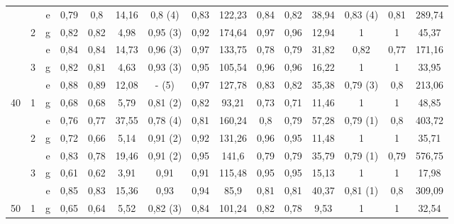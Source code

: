 \begin{table}[h!]
{\begin{tabular}{|c|c|c||ccc|ccc||ccc|ccc|}
          &       & e     & 0,79  & 0,8   & 14,16 & \textcolor[rgb]{ 1,  0,  0}{0,8 (4)} & 0,83  & 122,23 & 0,84  & 0,82  & 38,94 & \textcolor[rgb]{ 1,  0,  0}{0,83 (4)} & 0,81  & 289,74 \bigstrut[b]\\
\cline{2-15}          & \multirow{2}[2]{*}{2} & g     & 0,82  & 0,82  & 4,98  & \textcolor[rgb]{ 1,  0,  0}{0,95 (3)} & 0,92  & 174,64 & 0,97  & 0,96  & 12,94 & 1     & 1     & 45,37 \bigstrut[t]\\
          &       & e     & 0,84  & 0,84  & 14,73 & \textcolor[rgb]{ 1,  0,  0}{0,96 (3)} & 0,97  & 133,75 & 0,78  & 0,79  & 31,82 & 0,82  & 0,77  & 171,16 \bigstrut[b]\\
\cline{2-15}          & \multirow{2}[2]{*}{3} & g     & 0,82  & 0,81  & 4,63  & \textcolor[rgb]{ 1,  0,  0}{0,93 (3)} & 0,95  & 105,54 & 0,96  & 0,96  & 16,22 & 1     & 1     & 33,95 \bigstrut[t]\\
          &       & e     & 0,88  & 0,89  & 12,08 & \textcolor[rgb]{ 1,  0,  0}{- (5)} & 0,97  & 127,78 & 0,83  & 0,82  & 35,38 & \textcolor[rgb]{ 1,  0,  0}{0,79 (3)} & 0,8   & 213,06 \bigstrut[b]\\
    \hline
    \hline
    \multirow{6}[6]{*}{40} & \multirow{2}[2]{*}{1} & g     & 0,68  & 0,68  & 5,79  & \textcolor[rgb]{ 1,  0,  0}{0,81 (2)} & 0,82  & 93,21 & 0,73  & 0,71  & 11,46 & 1     & 1     & 48,85 \bigstrut[t]\\
          &       & e     & 0,76  & 0,77  & 37,55 & \textcolor[rgb]{ 1,  0,  0}{0,78 (4)} & 0,81  & 160,24 & 0,8   & 0,79  & 57,28 & \textcolor[rgb]{ 1,  0,  0}{0,79 (1)} & 0,8   & 403,72 \bigstrut[b]\\
\cline{2-15}          & \multirow{2}[2]{*}{2} & g     & 0,72  & 0,66  & 5,14  & \textcolor[rgb]{ 1,  0,  0}{0,91 (2)} & 0,92  & 131,26 & 0,96  & 0,95  & 11,48 & 1     & 1     & 35,71 \bigstrut[t]\\
          &       & e     & 0,83  & 0,78  & 19,46 & \textcolor[rgb]{ 1,  0,  0}{0,91 (2)} & 0,95  & 141,6 & 0,79  & 0,79  & 35,79 & \textcolor[rgb]{ 1,  0,  0}{0,79 (1)} & 0,79  & 576,75 \bigstrut[b]\\
\cline{2-15}          & \multirow{2}[2]{*}{3} & g     & 0,61  & 0,62  & 3,91  & 0,91  & 0,91  & 115,48 & 0,95  & 0,95  & 15,13 & 1     & 1     & 17,98 \bigstrut[t]\\
          &       & e     & 0,85  & 0,83  & 15,36 & 0,93  & 0,94  & 85,9  & 0,81  & 0,81  & 40,37 & \textcolor[rgb]{ 1,  0,  0}{0,81 (1)} & 0,8   & 309,09 \bigstrut[b]\\
    \hline
    \hline
    \multirow{6}[6]{*}{50} & \multirow{2}[2]{*}{1} & g     & 0,65  & 0,64  & 5,52  & \textcolor[rgb]{ 1,  0,  0}{0,82 (3)} & 0,84  & 101,24 & 0,82  & 0,78  & 9,53  & 1     & 1     & 32,54 \bigstrut[t]\\

\end{tabular}}
\end{table}
